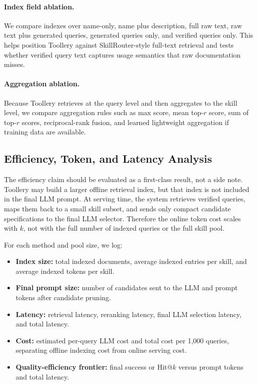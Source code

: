 \paragraph{Index field ablation.}
We compare indexes over name-only, name plus description, full raw text, raw text
plus generated queries, generated queries only, and verified queries only. This
helps position Toollery against SkillRouter-style full-text retrieval and tests
whether verified query text captures usage semantics that raw documentation
misses.

\paragraph{Aggregation ablation.}
Because Toollery retrieves at the query level and then aggregates to the skill
level, we compare aggregation rules such as max score, mean top-$r$ score, sum of
top-$r$ scores, reciprocal-rank fusion, and learned lightweight aggregation if
training data are available.

\subsection{Efficiency, Token, and Latency Analysis}
\label{subsec:efficiency}

The efficiency claim should be evaluated as a first-class result, not a side
note. Toollery may build a larger offline retrieval index, but that index is not
included in the final LLM prompt. At serving time, the system retrieves verified
queries, maps them back to a small skill subset, and sends only compact
candidate specifications to the final LLM selector. Therefore the online token
cost scales with $k$, not with the full number of indexed queries or the full
skill pool.

For each method and pool size, we log:
\begin{itemize}
    \item \textbf{Index size:} total indexed documents, average indexed entries
    per skill, and average indexed tokens per skill.
    \item \textbf{Final prompt size:} number of candidates sent to the LLM and
    prompt tokens after candidate pruning.
    \item \textbf{Latency:} retrieval latency, reranking latency, final LLM
    selection latency, and total latency.
    \item \textbf{Cost:} estimated per-query LLM cost and total cost per 1,000
    queries, separating offline indexing cost from online serving cost.
    \item \textbf{Quality-efficiency frontier:} final success or Hit@$k$ versus
    prompt tokens and total latency.
\end{itemize}

